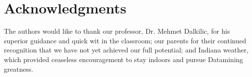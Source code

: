 \documentclass[fleqn,10pt]{SelfArx} %
\begin{document}
\section*{Acknowledgments} %
The authors would like to thank our professor, Dr. Mehmet Dalkilic, for his superior guidance and quick wit in the classroom; our parents for their continued recognition that we have not yet achieved our full potential; and Indiana weather, which provided ceaseless encouragement to stay indoors and pursue Datamining greatness.






\end{document}

